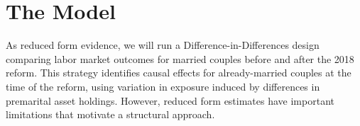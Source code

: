 \documentclass[11pt]{article}
\begin{document}


\section*{The Model}
As reduced form evidence, we will run a Difference-in-Differences design comparing labor market outcomes for married couples before and after the 2018 reform. This strategy identifies causal effects for already-married couples at the time of the reform, using variation in exposure induced by differences in premarital asset holdings. However, reduced form estimates have important limitations that motivate a structural approach. 
\end{document}
